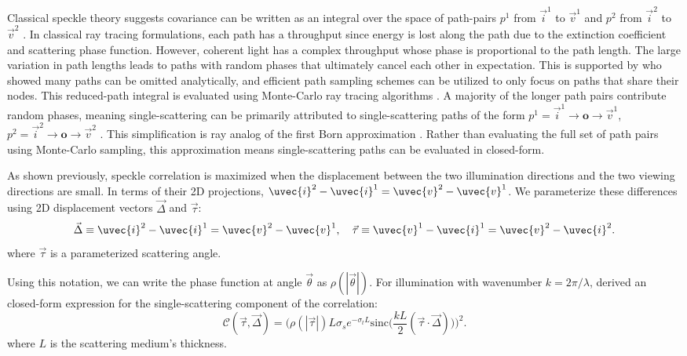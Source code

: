 Classical speckle theory suggests covariance can be written as an integral over the space of path-pairs $p^1$ from $\vec{i}^1$ to $\vec{v}^1$ and $p^2$ from $\vec{i}^2$ to $\vec{v}^2$ \cite{twersky1964propagation}. In classical ray tracing formulations, each path has a throughput since energy is lost along the path due to the extinction coefficient and scattering phase function. However, coherent light has a complex throughput whose phase is proportional to the path length. The large variation in path lengths leads to paths with random phases that ultimately cancel each other in expectation. This is supported by \cite{bar2019monte} who showed many paths can be omitted analytically, and efficient path sampling schemes can be utilized to only focus on paths that share their nodes. This reduced-path integral is evaluated using Monte-Carlo ray tracing algorithms \cite{novak2018monte, dutre2018advanced}.
A majority of the longer path pairs contribute random phases, meaning single-scattering can be primarily attributed to single-scattering paths of the form $p^1 = \vec{i}^1 \rightarrow \mathbf{o} \rightarrow \vec{v}^1$, $p^2 = \vec{i}^2 \rightarrow \mathbf{o} \rightarrow \vec{v}^2$ \cite{bar2021single}. This simplification is ray analog of the first Born approximation \cite{newton2002three}. Rather than evaluating the full set of path pairs using Monte-Carlo sampling, this approximation means single-scattering paths can be evaluated in closed-form.

As shown previously, speckle correlation is maximized when the displacement between the two illumination directions and the two viewing directions are small. In terms of their 2D projections, $\uvec{i}^2 - \uvec{i}^1 = \uvec{v}^2 - \uvec{v}^1$. We parameterize these differences using 2D displacement vectors $\vec{\Delta}$ and $\vec{\tau}$:
%
\begin{equation}
    \vec{\Delta} \equiv \uvec{i}^2 - \uvec{i}^1 = \uvec{v}^2 - \uvec{v}^1, \quad \vec{\tau} \equiv \uvec{v}^1 - \uvec{i}^1 = \uvec{v}^2 - \uvec{i}^2.
\end{equation}
%
where $\vec{\tau}$ is a parameterized scattering angle.

Using this notation, we can write the phase function at angle $\vec{\theta}$ as $\rho(|\vec{\theta}|)$. For illumination with wavenumber $k=2\pi / \lambda$, \cite{bar2021single} derived an closed-form expression for the single-scattering component of the correlation:
%
\begin{equation}
    \mathcal{C}(\vec{\tau}, \vec{\Delta}) = \bigg(\rho(|\vec{\tau}|) L \sigma_s e^{-\sigma_t L} \text{sinc}\bigg(\frac{kL}{2} (\vec{\tau} \cdot \vec{\Delta})\bigg)\bigg)^2.
    \label{eqn:closed-form_correlation}
\end{equation}
where $L$ is the scattering medium's thickness.

